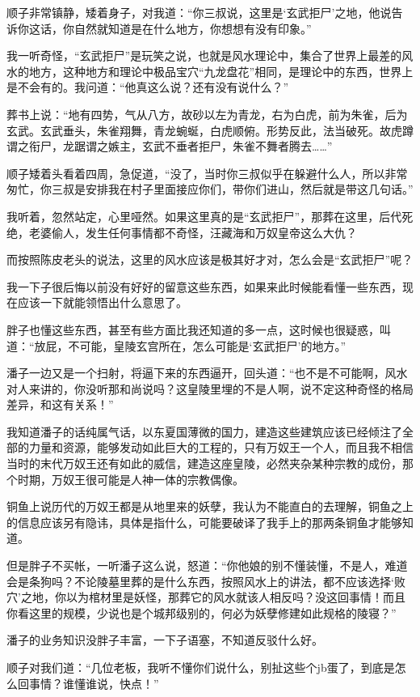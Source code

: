 顺子非常镇静，矮着身子，对我道：“你三叔说，这里是‘玄武拒尸’之地，他说告诉你这话，你自然就知道是在什么地方，你想想有没有印象。”

我一听奇怪，“玄武拒尸”是玩笑之说，也就是风水理论中，集合了世界上最差的风水的地方，这种地方和理论中极品宝穴“九龙盘花”相同，是理论中的东西，世界上是不会有的。我问道：“他真这么说？还有没有说什么？”

葬书上说：“地有四势，气从八方，故砂以左为青龙，右为白虎，前为朱雀，后为玄武。玄武垂头，朱雀翔舞，青龙蜿蜒，白虎顺俯。形势反此，法当破死。故虎蹲谓之衔尸，龙踞谓之嫉主，玄武不垂者拒尸，朱雀不舞者腾去……”

顺子矮着头看着四周，急促道，“没了，当时你三叔似乎在躲避什么人，所以非常匆忙，你三叔是安排我在村子里面接应你们，带你们进山，然后就是带这几句话。”

我听着，忽然站定，心里哑然。如果这里真的是“玄武拒尸”，那葬在这里，后代死绝，老婆偷人，发生任何事情都不奇怪，汪藏海和万奴皇帝这么大仇？

而按照陈皮老头的说法，这里的风水应该是极其好才对，怎么会是“玄武拒尸”呢？

我一下子很后悔以前没有好好的留意这些东西，如果来此时候能看懂一些东西，现在应该一下就能领悟出什么意思了。

胖子也懂这些东西，甚至有些方面比我还知道的多一点，这时候也很疑惑，叫道：“放屁，不可能，皇陵玄宫所在，怎么可能是‘玄武拒尸’的地方。”

潘子一边又是一个扫射，将逼下来的东西逼开，回头道：“也不是不可能啊，风水对人来讲的，你没听那和尚说吗？这皇陵里埋的不是人啊，说不定这种奇怪的格局差异，和这有关系！”

我知道潘子的话纯属气话，以东夏国薄微的国力，建造这些建筑应该已经倾注了全部的力量和资源，能够发动如此巨大的工程的，只有万奴王一个人，而且我不相信当时的末代万奴王还有如此的威信，建造这座皇陵，必然夹杂某种宗教的成份，那个时期，万奴王很可能是人神一体的宗教偶像。

铜鱼上说历代的万奴王都是从地里来的妖孽，我认为不能直白的去理解，铜鱼之上的信息应该另有隐讳，具体是指什么，可能要破译了我手上的那两条铜鱼才能够知道。

但是胖子不买帐，一听潘子这么说，怒道：“你他娘的别不懂装懂，不是人，难道会是条狗吗？不论陵墓里葬的是什么东西，按照风水上的讲法，都不应该选择‘败穴’之地，你以为棺材里是妖怪，那葬它的风水就该人相反吗？没这回事情！而且你看这里的规模，少说也是个城邦级别的，何必为妖孽修建如此规格的陵寝？”

潘子的业务知识没胖子丰富，一下子语塞，不知道反驳什么好。

顺子对我们道：“几位老板，我听不懂你们说什么，别扯这些个jb蛋了，到底是怎么回事情？谁懂谁说，快点！”

